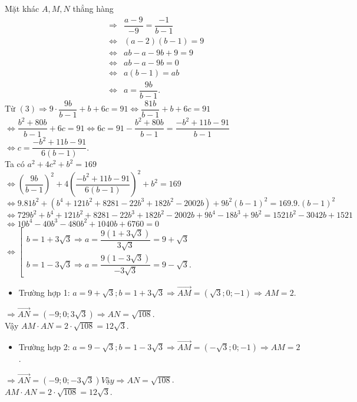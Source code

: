 \begin{ex}
{	Mặt khác $A, M, N$ thẳng hàng 
	\begin{eqnarray*}& \Rightarrow& \dfrac{a-9}{-9}=\dfrac{-1}{b-1}\\
	&\Leftrightarrow&(a-2)(b-1)=9 \\
	& \Leftrightarrow& a b-a-9b+9=9 \\
	& \Leftrightarrow& a b-a-9b=0\\
	& \Leftrightarrow& a(b-1)=a b\\
	& \Leftrightarrow& a=\dfrac{9b}{b-1}.
	\end{eqnarray*}
	Từ $(3) \Rightarrow 9\cdot \dfrac{9b}{b-1}+b+6c=91 \Leftrightarrow \dfrac{81b}{b-1}+b+6c=91$\\
	$\Leftrightarrow \dfrac{b^2+80b}{b-1}+6c=91\Leftrightarrow 6c=91-\dfrac{b^2+80b}{b-1}=\dfrac{-b^2+11b-91}{b-1}$\\
	$\Leftrightarrow c=\dfrac{-b^2+11b-91}{6(b-1)}$.\\
	Ta có $a^2+4c^2+b^2=169$\\
	$\Leftrightarrow\left(\dfrac{9b}{b-1}\right)^2+4\left(\dfrac{-b^2+11b-91}{6(b-1)}\right)^2+b^2=169$\\
	$\Leftrightarrow 9.81b^2+\left(b^4+121b^2+8281-22b^3+182b^2-2002b\right)+9b^2(b-1)^2=169.9.(b-1)^2$\\
	$\Leftrightarrow 729b^2+b^4+121b^2+8281-22b^3+182b^2-2002b+9b^4-18b^3+9b^2=1521b^2-3042b+1521$\\
	$\Leftrightarrow 10b^4-40b^3-480b^2+1040b+6760=0$\\
	$\Leftrightarrow\left[\begin{array}{l}b=1+3\sqrt{3} \Rightarrow a=\dfrac{9(1+3\sqrt{3})}{3\sqrt{3}}=9+\sqrt{3} \\ b=1-3\sqrt{3} \Rightarrow a=\dfrac{9(1-3\sqrt{3})}{-3\sqrt{3}}=9-\sqrt{3}.\end{array}\right.$
	\begin{itemize}
		\item Trường hợp 1: $ a=9+\sqrt{3}; b=1+3\sqrt{3} \Rightarrow \overrightarrow{AM}=(\sqrt{3}; 0;-1) \Rightarrow AM=2$.
	\end{itemize}
	$\Rightarrow \overrightarrow{AN}=(-9; 0; 3\sqrt{3}) \Rightarrow AN=\sqrt{108}$.\\
	Vậy $AM\cdot AN=2\cdot \sqrt{108}=12\sqrt{3}$.
	\begin{itemize}
		\item Trường hợp 2: $a=9-\sqrt{3}; b=1-3\sqrt{3} \Rightarrow \overrightarrow{AM}=(-\sqrt{3}; 0;-1) \Rightarrow AM=2$.
	\end{itemize}
	$\Rightarrow \overrightarrow{AN}=(-9; 0;-3\sqrt{3}) Vậy \Rightarrow AN=\sqrt{108}$.\\
	$AM\cdot AN=2\cdot \sqrt{108}=12\sqrt{3}$.
}
\end{ex}

